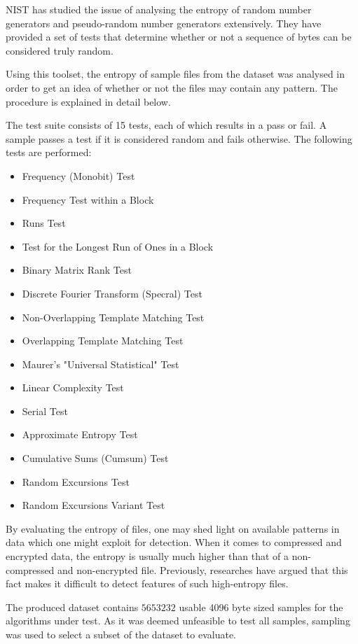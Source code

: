 \documentclass[conference]{IEEEtran}
\begin{document}
NIST has studied the issue of analysing the entropy of random number generators and pseudo-random number generators extensively. They have provided a set of tests that determine whether or not a sequence of bytes can be considered truly random\cite{NIST2010}.

Using this toolset, the entropy of sample files from the dataset was analysed in order to get an idea of whether or not the files may contain any pattern. The procedure is explained in detail below.

The test suite consists of 15 tests, each of which results in a pass or fail. A sample passes a test if it is considered random and fails otherwise. The following tests are performed:

\begin{itemize}
    \item Frequency (Monobit) Test
    \item Frequency Test within a Block
    \item Runs Test
    \item Test for the Longest Run of Ones in a Block
    \item Binary Matrix Rank Test
    \item Discrete Fourier Transform (Specral) Test
    \item Non-Overlapping Template Matching Test
    \item Overlapping Template Matching Test
    \item Maurer's "Universal Statistical" Test
    \item Linear Complexity Test
    \item Serial Test
    \item Approximate Entropy Test
    \item Cumulative Sums (Cumsum) Test
    \item Random Excursions Test
    \item Random Excursions Variant Test
\end{itemize}

By evaluating the entropy of files, one may shed light on available patterns in data which one might exploit for detection. When it comes to compressed and encrypted data, the entropy is usually much higher than that of a non-compressed and non-encrypted file. Previously, researches have argued that this fact makes it difficult to detect features of such high-entropy files\cite{PENROSE2013}.

The produced dataset contains $5653232$ usable 4096 byte sized samples for the algorithms under test. As it was deemed unfeasible to test all samples, sampling was used to select a subset of the dataset to evaluate.
\end{document}
